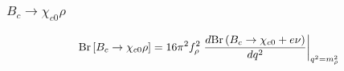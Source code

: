 \documentclass{beamer}
\begin{document}
\begin{frame}
  \frametitle{$B_c \to \chi_{c0} \rho$}
  $$
  \mathrm{Br}\left[B_c \to \chi_{c0} \rho\right] =
  16\pi^2 f_\rho^2 \left.
    \frac{d\mathrm{Br}\left(B_c\to\chi_{c0}+e\nu\right)}{dq^2}
  \right|_{q^2=m_\rho^2}
  $$
  \begin{columns}
    \begin{column}{0.5\textwidth}
      \vspace{3mm}
      
    \end{column}
  \begin{column}{0.5\textwidth}
      \\
      \vspace{3mm}
      
       \end{column}
\end{columns}
\end{frame}
\end{document}

